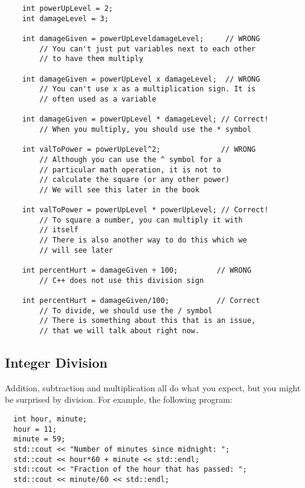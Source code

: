 \begin{mdframed}
\begin{verbatim}
    int powerUpLevel = 2;
    int damageLevel = 3;
    
    int damageGiven = powerUpLeveldamageLevel;     // WRONG 
        // You can't just put variables next to each other
        // to have them multiply
        
    int damageGiven = powerUpLevel x damageLevel;  // WRONG 
        // You can't use x as a multiplication sign. It is
        // often used as a variable
        
    int damageGiven = powerUpLevel * damageLevel; // Correct!
        // When you multiply, you should use the * symbol
    
    int valToPower = powerUpLevel^2;              // WRONG
        // Although you can use the ^ symbol for a 
        // particular math operation, it is not to 
        // calculate the square (or any other power)
        // We will see this later in the book
        
    int valToPower = powerUpLevel * powerUpLevel; // Correct! 
        // To square a number, you can multiply it with
        // itself
        // There is also another way to do this which we
        // will see later
        
    int percentHurt = damageGiven ÷ 100;         // WRONG
        // C++ does not use this division sign
    
    int percentHurt = damageGiven/100;           // Correct
        // To divide, we should use the / symbol
        // There is something about this that is an issue,
        // that we will talk about right now.
\end{verbatim}
\end{mdframed}
%

\subsection{Integer Division}
Addition, subtraction and multiplication all do what you
expect, but you might be surprised by division.  For example,
the following program:

\begin{mdframed}

\begin{verbatim}
  int hour, minute;
  hour = 11;
  minute = 59;
  std::cout << "Number of minutes since midnight: ";
  std::cout << hour*60 + minute << std::endl;
  std::cout << "Fraction of the hour that has passed: ";
  std::cout << minute/60 << std::endl;
\end{verbatim}
\end{mdframed}
%

